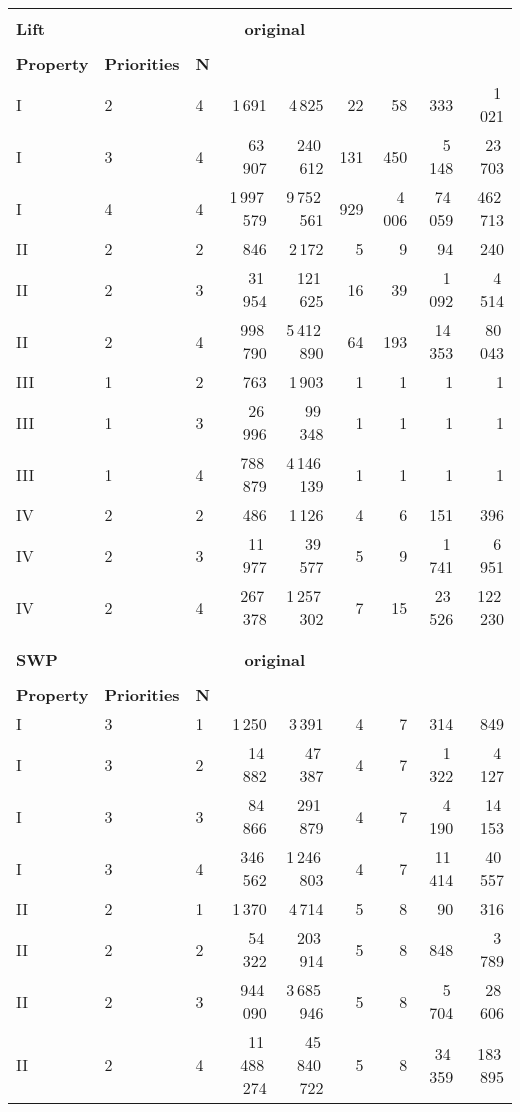 \documentclass[a4paper]{llncs}
\begin{document}
\begin{table}[!ht]
\begin{tabular}{lll||rr|rr|rr}
\\
\\
\textbf{Lift} & & &
\multicolumn{2}{c}{\textbf{original}} & \multicolumn{2}{c}{} & \multicolumn{2}{c}{} \\
\hline
\hline
& & & \\
\textbf{Property} & \textbf{Priorities} & \textbf{N} &
\textbf{} & \textbf{~} & \textbf{} & \textbf{~} & \textbf{} & \textbf{} \\
\hline 
I & 2 & 4 & 1\,691 & 4\,825 & 22 & 58 & 333 & 1\,021\\ \hline 
I & 3 & 4 & 63\,907 & 240\,612 & 131 & 450 & 5\,148 & 23\,703 \\ \hline 
I & 4 & 4 & 1\,997\,579 & 9\,752\,561 & 929 & 4\,006 & 74\,059 & 462\,713 \\ \hline
II & 2 & 2 & 846 & 2\,172 & 5 & 9 & 94 & 240 \\ \hline 
II & 2 & 3 & 31\,954 & 121\,625 & 16 & 39 & 1\,092 & 4\,514 \\ \hline 
II & 2 & 4 & 998\,790 & 5\,412\,890 & 64 & 193 & 14\,353 & 80\,043 \\ \hline 
III & 1 & 2 & 763 & 1\,903 & 1 & 1 & 1 & 1 \\ \hline 
III & 1 & 3 & 26\,996 & 99\,348 & 1 & 1 & 1 & 1 \\ \hline 
III & 1 & 4 & 788\,879 & 4\,146\,139 & 1 & 1 & 1 & 1 \\ \hline 
IV & 2 & 2 & 486 & 1\,126 & 4 & 6 & 151 & 396 \\ \hline 
IV & 2 & 3 & 11\,977 & 39\,577 & 5 & 9 & 1\,741 & 6\,951 \\ \hline 
IV & 2 & 4 & 267\,378 & 1\,257\,302 & 7 & 15 & 23\,526 & 122\,230 \\ \hline 


\\
\\
\textbf{SWP} & & &
\multicolumn{2}{c}{\textbf{original}} & \multicolumn{2}{c}{} & \multicolumn{2}{c}{} \\
\hline
\hline
& & & \\
\textbf{Property} & \textbf{Priorities} & \textbf{N} &
\textbf{} & \textbf{~} & \textbf{} & \textbf{~} & \textbf{} & \textbf{} \\
\hline 

I &3 & 1 &   1\,250 & 3\,391 & 4 & 7 & 314 & 849 \\ \hline 
I &3 & 2 &   14\,882 & 47\,387 & 4 & 7 & 1\,322 & 4\,127 \\ \hline
I &3 & 3 &   84\,866 & 291\,879 & 4 & 7 & 4\,190 & 14\,153 \\ \hline 
I &3 & 4 &   346\,562 & 1\,246\,803 & 4 & 7 & 11\,414 & 40\,557 \\ \hline 
II&2 & 1  &  1\,370 & 4\,714 & 5 & 8 & 90 & 316 \\ \hline  
II&2 & 2  &  54\,322 & 203\,914 & 5 & 8 & 848 & 3\,789 \\ \hline 
II&2 & 3  &  944\,090 & 3\,685\,946 & 5 & 8 & 5\,704 & 28\,606 \\ \hline 
II&2 & 4  &  11\,488\,274 & 45\,840\,722 & 5 & 8 & 34\,359 & 183\,895 \\
\hline
\end{tabular}
 \end{table}
\end{document}
